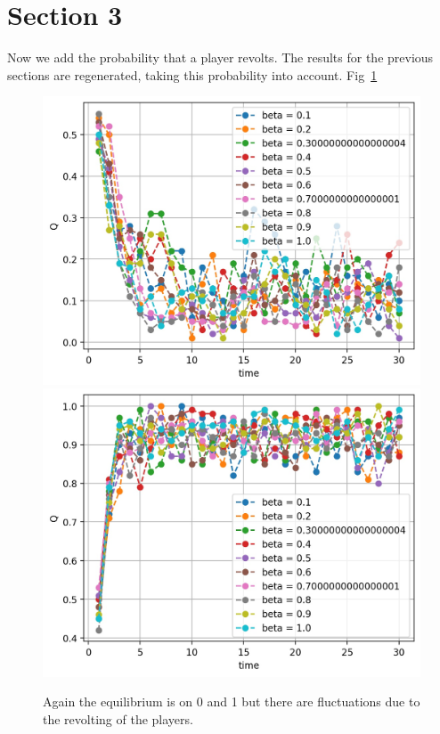 \documentclass[12pt, a4paper]{article}
\begin{document}
	\section{Section 3}
	Now we add the probability that a player revolts. The results for the previous sections are regenerated, taking this probability into account.
	Fig~\ref{fig:revolt}
	\begin{figure}[h!]
		\centering
		\includegraphics[width=.45\linewidth]{../results/Q_t_betas_rev_1.jpg}
		\includegraphics[width=.45\linewidth]{../results/Q_t_betas_rev_2.jpg}
		\caption{Again the equilibrium is on 0 and 1 but there are fluctuations due to the revolting of the players.}
		\label{fig:revolt}
	\end{figure}
\end{document}
